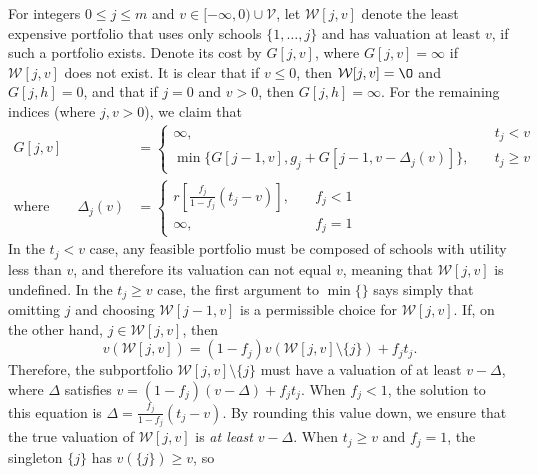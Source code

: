 \documentclass[12pt]{article} %
\theoremstyle{definition}
\theoremstyle{definition}
\begin{document}
For integers $0 \leq j \leq m$ and $v \in [-\infty, 0) \cup \mathcal{V}$, let $\mathcal{W}[j, v]$ denote the least expensive portfolio that uses only schools $\{ 1, \dots, j\}$ and has valuation at least $v$, if such a portfolio exists. Denote its cost by $G[j, v]$, where $G[j, v] = \infty$ if $\mathcal{W}[j, v]$ does not exist. It is clear that if $v \leq 0$, then $\mathcal{W}[j, v] = \O$ and $G[j, h] = 0$, and that if $j = 0$ and $v > 0$, then $G[j, h] = \infty$.  For the remaining indices (where $j, v > 0$), we claim that
\begin{align} \label{recursionrelationforcostmindp}
G[j, v] &=
\begin{cases}
\infty, \quad & t_j < v \\
\min\bigl\{G[j-1, v], g_j + G[j-1, v - \Delta_j(v)] \bigr\}, \quad & t_j \geq v 
\end{cases}\\
\text{where}\qquad
\Delta_j (v) &= 
\begin{cases}
r\left[\frac{f_j}{1 - f_j} (t_j - v)\right], \quad & f_j < 1\\
\infty, &f_j = 1
\end{cases} \label{deltajvdef}
\end{align}
In the $t_j < v$ case, any feasible portfolio must be composed of schools with utility less than $v$, and therefore its valuation can not equal $v$, meaning that $\mathcal{W}[j, v]$ is undefined. In the $t_j \geq v$ case, the first argument to $\min\{\}$ says simply that omitting $j$ and choosing $\mathcal{W}[j-1, v]$ is a permissible choice for $\mathcal{W}[j, v]$. If, on the other hand, $j \in \mathcal{W}[j, v]$, then
\begin{equation} \label{solvemeforvwjvminusj}
v(\mathcal{W}[j, v]) = (1 - f_j )v(\mathcal{W}[j, v]\setminus \{j\}) + f_j t_j.\end{equation}
Therefore, the subportfolio $\mathcal{W}[j, v]\setminus \{j\}$ must have a valuation of at least $v - \Delta$, where $\Delta$ satisfies $v = (1 - f_j )(v - \Delta) + f_j t_j $. When $f_j < 1$, the solution to this equation is $ \Delta = \frac{f_j}{1 - f_j} (t_j - v)$. By rounding this value down, we ensure that the true valuation of $\mathcal{W}[j, v]$ is \emph{at least} $v - \Delta$. When $t_j \geq v$ and $f_j = 1$, the singleton $\{j\}$ has $v(\{j\}) \geq v$, so
\end{document}
